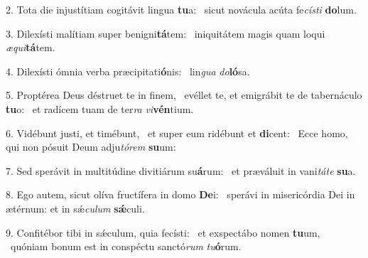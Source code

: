 2. Tota die injustítiam cogitávit lingua \textbf{tu}a: \ast\  sicut novácula acúta fe\textit{cís}\textit{ti} \textbf{do}lum.\

3. Dilexísti malítiam super benigni\textbf{tá}tem: \ast\  iniquitátem magis quam loqui \textit{æ}\textit{qui}\textbf{tá}tem.\

4. Dilexísti ómnia verba præcipitati\textbf{ó}nis: \ast\  lin\textit{gua} \textit{do}\textbf{ló}sa.\

5. Proptérea Deus déstruet te in finem, \dag\  evéllet te, et emigrábit te de tabernáculo \textbf{tu}o: \ast\  et radícem tuam de ter\textit{ra} \textit{vi}\textbf{vén}tium.\

6. Vidébunt justi, et timébunt, \dag\  et super eum ridébunt et \textbf{di}cent: \ast\  Ecce homo, qui non pósuit Deum adju\textit{tó}\textit{rem} \textbf{su}um:\

7. Sed sperávit in multitúdine divitiárum su\textbf{á}rum: \ast\  et præváluit in vani\textit{tá}\textit{te} \textbf{su}a.\

8. Ego autem, sicut olíva fructífera in domo \textbf{De}i: \ast\  sperávi in misericórdia Dei in ætérnum: et in sǽ\textit{cu}\textit{lum} \textbf{sǽ}culi.\

9. Confitébor tibi in sǽculum, quia fecísti: \dag\  et exspectábo nomen \textbf{tu}um, \ast\  quóniam bonum est in conspéctu sanctó\textit{rum} \textit{tu}\textbf{ó}rum.\

